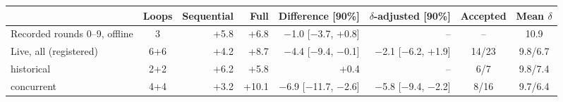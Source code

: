 \begin{tabular}{@{}lcrrrrcc@{}}
\toprule
 & Loops & Sequential & Full & Difference [90\%] & $\delta$-adjusted [90\%] & Accepted & Mean $\delta$ \\
\midrule
Recorded rounds 0--9, offline & 3 & +5.8 & +6.8 & $-$1.0 [$-$3.7, +0.8] & -- & -- & 10.9 \\
Live, all (registered) & 6+6 & +4.2 & +8.7 & $-$4.4 [$-$9.4, $-$0.1] & $-$2.1 [$-$6.2, +1.9] & 14/23 & 9.8/6.7 \\
\quad historical & 2+2 & +6.2 & +5.8 & +0.4 & -- & 6/7 & 9.8/7.4 \\
\quad concurrent & 4+4 & +3.2 & +10.1 & $-$6.9 [$-$11.7, $-$2.6] & $-$5.8 [$-$9.4, $-$2.2] & 8/16 & 9.7/6.4 \\
\bottomrule
\end{tabular}
